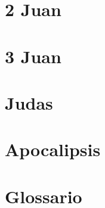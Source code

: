 \chapter{2 Juan}
\begin{multicols}{2}
  \raggedcolumns
  \parskip=0pt \relax
  
\end{multicols}

\chapter{3 Juan}
\begin{multicols}{2}
  \raggedcolumns
  \parskip=0pt \relax
  
\end{multicols}

\chapter{Judas}
\begin{multicols}{2}
  \raggedcolumns
  \parskip=0pt \relax
  
\end{multicols}

\chapter{Apocalipsis}
\begin{multicols}{2}
  \raggedcolumns
  \parskip=0pt \relax
  
\end{multicols}

\chapter{Glossario}
\begin{multicols}{2}
  \raggedcolumns
  \parskip=0pt \relax
  
\end{multicols}

\newpage





















